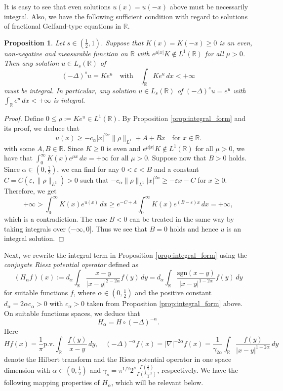 \documentclass[reqno,10pt,a4paper]{amsart}
\newtheorem{prop}{Proposition}[section]
\theoremstyle{definition}
\theoremstyle{definition}
\theoremstyle{remark}
\theoremstyle{remark}
\numberwithin{equation}{section}
\newcommand{\R}{\mathbb{R}}
\newcommand{\be}{\begin{equation}}
\newcommand{\ee}{\end{equation}}
\newcommand{\eps}{\varepsilon}
\newcommand{\Ds}{(-\Delta)^{s}}
\begin{document}
It is easy to see that even solutions $u(x)=u(-x)$ above must be necessarily integral. Also, we have the following sufficient condition with regard to solutions of fractional Gelfand-type equations in $\R$.

\begin{prop} \label{prop:good_decay}
Let $s \in (\frac{1}{2}, 1)$. Suppose that $K(x)=K(-x) \geq 0$ is an even, non-negative and measurable function on $\R$ with $e^{\mu |x|} K \not \in L^1(\R)$ for all $\mu >0$. Then any solution $u \in L_s(\R)$ of
$$
\Ds u = K e^u \quad \mbox{with} \quad \int_{\R} K e^u \, dx < +\infty
$$
must be integral. In particular, any solution $u \in L_s(\R)$ of $\Ds u = e^u$ with $\int_\R e^u \, dx < +\infty$ is integral.
\end{prop}

\begin{proof}
Define  $0 \leq \rho := K e^u \in L^1(\R)$. By Proposition \ref{prop:integral_form} and its proof, we deduce that
$$
u(x) \geq -c_\alpha |x|^{2\alpha} \| \rho \|_{L^1} + A + Bx \quad \mbox{for $x \in \R$}.
$$
with some $A, B \in \R$. Since $K \geq 0$ is even and $e^{\mu |x|} K \not \in L^1(\R)$ for all $\mu>0$, we have that $\int_{0}^\infty K(x) e^{\mu x} \,dx = +\infty$ for all $\mu > 0$. Suppose now that $B >0$ holds. Since $\alpha \in (0, \frac 1 2)$, we can find for any $0 < \eps < B$ and a constant $C=C(\eps, \| \rho \|_{L^1}) > 0$ such that $-c_\alpha \| \rho \|_{L^1} |x|^{2 \alpha} \geq -\eps x - C$ for $x \geq 0$. Therefore, we get
$$
+\infty > \int_0^\infty K(x) e^{u(x)} \, dx \geq  e^{-C+ A} \int_{0}^\infty K(x) e^{(B-\eps) x} \, dx = +\infty,
$$
which is a contradiction. The case $B < 0$ can be treated in the same way by taking integrals over $(-\infty,0]$. Thus we see that $B=0$ holds and hence $u$ is an integral solution.
\end{proof}


Next, we rewrite the integral term in Proposition \ref{prop:integral_form} using  the {\em conjugate Riesz potential operator} defined as
\be
\boxed{(H_\alpha f)(x) := d_\alpha \int_{\R} \frac{x-y}{|x-y|^{2-2 \alpha}} f(y) \, dy = d_\alpha \int_\R \frac{\mathrm{sgn}(x-y)}{|x-y|^{1-2 \alpha}} f(y) \, dy }
\ee 
for suitable functions $f$, where  $\alpha \in (0,\frac{1}{2})$ and the positive constant $d_\alpha = 2 \alpha c_\alpha > 0$ with $c_\alpha > 0$ taken from Proposition \ref{prop:integral_form} above. On suitable functions spaces, we deduce that
$$
H_\alpha = H \circ (-\Delta)^{-\alpha} .
$$
Here 
$$
H f(x) = \frac{1}{\pi} \mathrm{p.v.} \int_\R \frac{f(y)}{x-y} \, dy,  \quad  (-\Delta)^{-\alpha} f(x) = |\nabla|^{-2\alpha} f (x) = \frac{1}{\gamma_{2\alpha}} \int_\R \frac{f(y)}{|x-y|^{1-2 \alpha}} \, dy
$$ 
denote the Hilbert transform and the Riesz potential operator in one space dimension with $\alpha  \in (0,\frac{1}{2})$ and $\gamma_s = \pi^{1/2} 2^{s} \frac{\Gamma(\frac{s}{2})}{\Gamma(\frac{1-s}{2})}$, respectively. We have the following mapping properties of $H_\alpha$, which will be relevant below.
\end{document}
